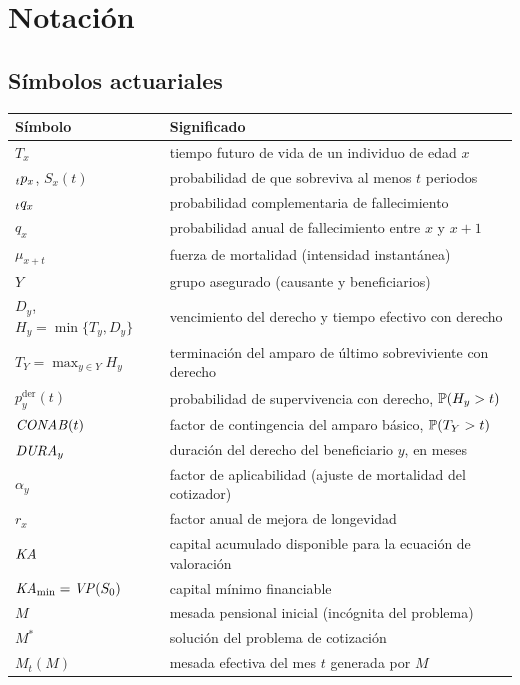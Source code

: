 \chapter{Notación}
\label{ap:notacion}

\section*{Símbolos actuariales}

\begin{longtable}{@{}p{}p{}@{}}
\toprule
\textbf{Símbolo} & \textbf{Significado} \\
\midrule
\endhead
$T_x$ & tiempo futuro de vida de un individuo de edad $x$ \\
${}_{t}p_{x}$, $S_x(t)$ & probabilidad de que sobreviva al menos $t$ periodos \\
${}_{t}q_{x}$ & probabilidad complementaria de fallecimiento \\
$q_x$ & probabilidad anual de fallecimiento entre $x$ y $x+1$ \\
$\mu_{x+t}$ & fuerza de mortalidad (intensidad instantánea) \\
$Y$ & grupo asegurado (causante y beneficiarios) \\
$D_y$, $H_y=\min\{T_y,D_y\}$ & vencimiento del derecho y tiempo efectivo con derecho \\
$T_Y=\max_{y\in Y}H_y$ & terminación del amparo de último sobreviviente con derecho \\
$p_y^{\mathrm{der}}(t)$ & probabilidad de supervivencia con derecho, $\mathbb{P}(H_y>t)$ \\
$\mathit{CONAB}(t)$ & factor de contingencia del amparo básico, $\mathbb{P}(T_Y>t)$ \\
$\mathit{DURA}_y$ & duración del derecho del beneficiario $y$, en meses \\
$\alpha_y$ & factor de aplicabilidad (ajuste de mortalidad del cotizador) \\
$r_x$ & factor anual de mejora de longevidad \\
\midrule
$\mathit{KA}$ & capital acumulado disponible para la ecuación de valoración \\
$\mathit{KA}_{\min}=\mathit{VP}(S_0)$ & capital mínimo financiable \\
$M$ & mesada pensional inicial (incógnita del problema) \\
$M^*$ & solución del problema de cotización \\
$M_t(M)$ & mesada efectiva del mes $t$ generada por $M$ \\

\end{longtable}
